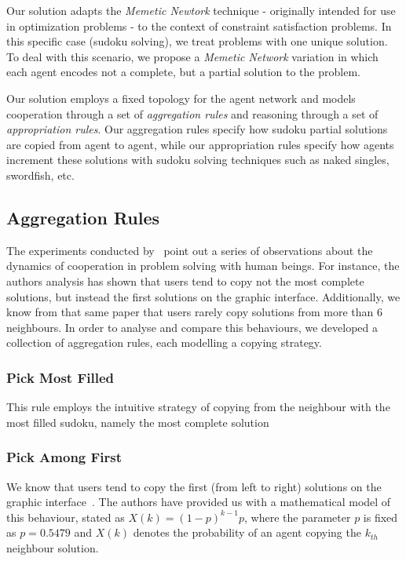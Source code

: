 \documentclass{article}
\begin{document}
Our solution adapts the {\em Memetic Newtork} technique - originally intended for use in optimization problems - to the context of constraint satisfaction problems. In this specific case (sudoku solving), we treat problems with one unique solution. To deal with this scenario, we propose a {\em Memetic Network} variation in which each agent encodes not a complete, but a partial solution to the problem.

Our solution employs a fixed topology for the agent network and models cooperation through a set of {\em aggregation rules} and reasoning through a set of {\em appropriation rules}. Our aggregation rules specify how sudoku partial solutions are copied from agent to agent, while our appropriation rules specify how agents increment these solutions with sudoku solving techniques such as naked singles, swordfish, etc.

\subsection{Aggregation Rules}

The experiments conducted by~\cite{farenzena:collabem} point out a series of observations about the dynamics of cooperation in problem solving with human beings. For instance, the authors analysis has shown that users tend to copy not the most complete solutions, but instead the first solutions on the graphic interface. Additionally, we know from that same paper that users rarely copy solutions from more than 6 neighbours. In order to analyse and compare this behaviours, we developed a collection of aggregation rules, each modelling a copying strategy.

\subsubsection{Pick Most Filled}

This rule employs the intuitive strategy of copying from the neighbour with the most filled sudoku, namely the most complete solution

\subsubsection{Pick Among First}

We know that users tend to copy the first (from left to right) solutions on the graphic interface~\cite{farenzena:collabem}. The authors have provided us with a mathematical model of this behaviour, stated as $X(k) = (1-p)^{k-1}p$, where the parameter $p$ is fixed as $p = 0.5479$ and $X(k)$ denotes the probability of an agent copying the $k_{th}$ neighbour solution.
\end{document}
